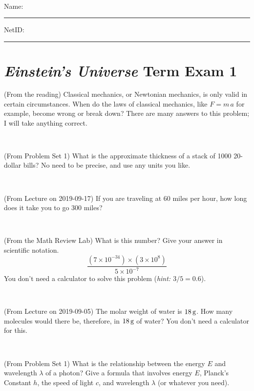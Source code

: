 \documentclass[12pt, letterpaper]{article}
\begin{document}
\vfill ~


\cleardoublepage



\noindent
Name: \rule[-1ex]{0.60\textwidth}{0.1pt}
NetID: \rule[-1ex]{0.20\textwidth}{0.1pt}

\section*{\textsl{Einstein's Universe} Term Exam 1}
\setcounter{problem}{1}


\begin{problem} (From the reading)
Classical mechanics, or Newtonian mechanics, is only valid in certain
circumstances. When do the laws of classical mechanics, like $F =
m\,a$ for example, become wrong or break down? There are many answers
to this problem; I will take anything correct.
\end{problem}


\vfill ~

\begin{problem} (From Problem Set 1)
What is the approximate thickness of a stack of 1000 20-dollar bills?
No need to be precise, and use any units you like.
\end{problem}


\vfill ~

\begin{problem} (From Lecture on 2019-09-17)
If you are traveling at 60 miles per hour, how long does
it take you to go 300 miles?
\end{problem}


\vfill ~

\begin{problem} (From the Math Review Lab)
What is this number? Give your answer in scientific notation.
$$
\frac{(7\times10^{-34})\times(3\times10^8)}{5\times10^{-7}}
$$
You don't need a calculator to solve this problem (\textit{hint: $3/5=0.6$}).
\end{problem}


\vfill ~


\clearpage


\begin{problem} (From Lecture on 2019-09-05)
The molar weight of water is $18\,\mathrm{g}$. How many molecules would there
be, therefore, in $18\,\mathrm{g}$ of water? You don't need a calculator for
this.
\end{problem}


\vfill ~

\begin{problem} (From Problem Set 1)
What is the relationship between the energy $E$ and wavelength
$\lambda$ of a photon? Give a formula that involves energy $E$,
Planck's Constant $h$, the speed of light $c$, and wavelength
$\lambda$ (or whatever you need).
\end{problem}
\end{document}
